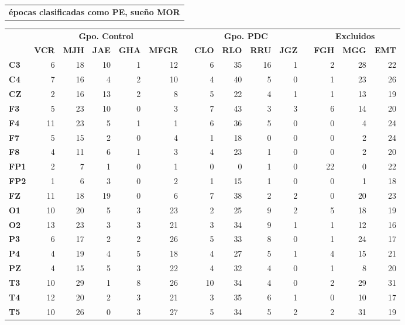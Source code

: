 \documentclass[12pt,a4paper]{mitthesis}
\begin{document}
\begin{SidewaysTable}
\centering
\begin{tabular}{c}
\textbf{\'epocas clasificadas como PE, sue\~no MOR}
\vspace{1em}
\end{tabular}
\begin{tabular}{lrrrrrcrrrrcrrr}
\toprule
& \multicolumn{5}{c}{\textbf{Gpo. Control}} && 
  \multicolumn{4}{c}{\textbf{Gpo. PDC}} && 
  \multicolumn{3}{c}{\textbf{Excluidos}}\\
\cmidrule{2-6} \cmidrule{8-11} \cmidrule{13-15}
& \textbf{VCR} & \textbf{MJH} & \textbf{JAE} & \textbf{GHA} & \textbf{MFGR} & \phantom{l}
& \textbf{CLO} & \textbf{RLO} & \textbf{RRU} & \textbf{JGZ} & \phantom{l}
& \textbf{FGH} & \textbf{MGG} & \textbf{EMT} \\
\midrule
\textbf{C3} &6 &18&10&1 &12&&6 &35&16&1 &&2 &28&22 \\
\textbf{C4} &7 &16&4 &2 &10&&4 &40&5 &0 &&1 &23&26 \\
\textbf{CZ} &2 &16&13&2 &8 &&5 &22&4 &1 &&1 &13&19 \\
\rowcolor{gris}
\textbf{F3} &5 &23&10&0 &3 &&7 &43&3 &3 &&6 &14&20 \\
\rowcolor{gris}
\textbf{F4} &11&23&5 &1 &1 &&6 &36&5 &0 &&0 &4 &24 \\
\rowcolor{gris}
\textbf{F7} &5 &15&2 &0 &4 &&1 &18&0 &0 &&0 &2 &24 \\
\rowcolor{gris}
\textbf{F8} &4 &11&6 &1 &3 &&4 &23&1 &0 &&0 &2 &20 \\
\textbf{FP1}&2 &7 &1 &0 &1 &&0 &0 &1 &0 &&22&0 &22 \\
\textbf{FP2}&1 &6 &3 &0 &2 &&1 &15&1 &0 &&0 &1 &18 \\
\textbf{FZ} &11&18&19&0 &6 &&7 &38&2 &2 &&0 &20&23 \\
\rowcolor{gris}
\textbf{O1} &10&20&5 &3 &23&&2 &25&9 &2 &&5 &18&19 \\
\rowcolor{gris}
\textbf{O2} &13&23&3 &3 &21&&3 &34&9 &1 &&1 &12&16 \\
\textbf{P3} &6 &17&2 &2 &26&&5 &33&8 &0 &&1 &24&17 \\
\textbf{P4} &4 &19&4 &5 &18&&4 &27&5 &1 &&4 &15&21 \\
\textbf{PZ} &4 &15&5 &3 &22&&4 &32&4 &0 &&1 &8 &20 \\
\rowcolor{gris}
\textbf{T3} &10&29&1 &8 &26&&10&34&4 &0 &&2 &29&31 \\
\rowcolor{gris}
\textbf{T4} &12&20&2 &3 &21&&3 &35&6 &1 &&0 &10&17 \\
\rowcolor{gris}
\textbf{T5} &10&26&0 &3 &27&&5 &34&5 &2 &&2 &31&19 \\

\end{tabular}
\end{SidewaysTable}
\end{document}
